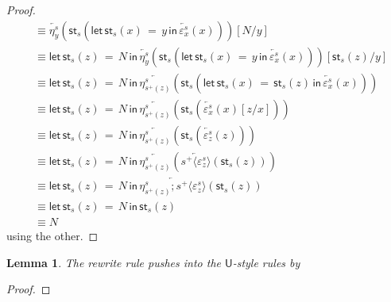 \documentclass[10pt]{article}
\newtheorem{lemma}{Lemma}
\theoremstyle{definition}
\newcommand{\rewrite}[2]{\overleftarrow{#1}(#2)}
\newcommand\StI[2]{\ensuremath{\mathsf{st}_{#1}(#2)}}
\newcommand\UStI[2]{\ensuremath{\mathsf{ust}_{#1}(#2)}}
\newcommand\UnSt[2]{\ensuremath{\mathsf{unst}_{#1}(#2)}}
\newcommand\StE[4]{\ensuremath{\mathsf{let} \, \StI{#1}{#3} \, = \, {#2} \, \mathsf{in} \, #4}}
\newcommand\TrPlus[2]{\ensuremath{{#1}^+(#2)}}
\newcommand\ap[2]{\ensuremath{#1 \langle #2 \rangle }}
\begin{document}
\begin{proof}
\begin{align*}
&\equiv \rewrite{\eta^s_y}{\StI{s}{\StE{s}{y}{x}{\rewrite{\varepsilon^s_x}{x}}}}[N/y] \\ 
&\equiv \StE{s}{N}{z}{\rewrite{\eta^s_y}{\StI{s}{\StE{s}{y}{x}{\rewrite{\varepsilon^s_x}{x}}}}[\StI{s}{z}/y]} \\ 
&\equiv \StE{s}{N}{z}{\rewrite{\eta^s_{\TrPlus{s}{z}}}{\StI{s}{\StE{s}{\StI{s}{z}}{x}{\rewrite{\varepsilon^s_x}{x}}}}} \\ 
&\equiv \StE{s}{N}{z}{\rewrite{\eta^s_{\TrPlus{s}{z}}}{\StI{s}{\rewrite{\varepsilon^s_x}{x}[z/x]}}} \\ 
&\equiv \StE{s}{N}{z}{\rewrite{\eta^s_{\TrPlus{s}{z}}}{\StI{s}{\rewrite{\varepsilon^s_z}{z}}}} \\ 
&\equiv \StE{s}{N}{z}{\rewrite{\eta^s_{\TrPlus{s}{z}}}{\rewrite{\ap{s^+}{\varepsilon^s_z}}{\StI{s}{z}}}} \\ 
&\equiv \StE{s}{N}{z}{\rewrite{\eta^s_{\TrPlus{s}{z}};\ap{s^+}{\varepsilon^s_z}}{\StI{s}{z}}} \\ 
&\equiv \StE{s}{N}{z}{\StI{s}{z}} \\ 
&\equiv N
\end{align*}
using the other.
\end{proof}

\begin{lemma}
The rewrite rule pushes into the $\mathsf{U}$-style rules by
\end{lemma}
\begin{proof}
\end{proof}
\end{document}
